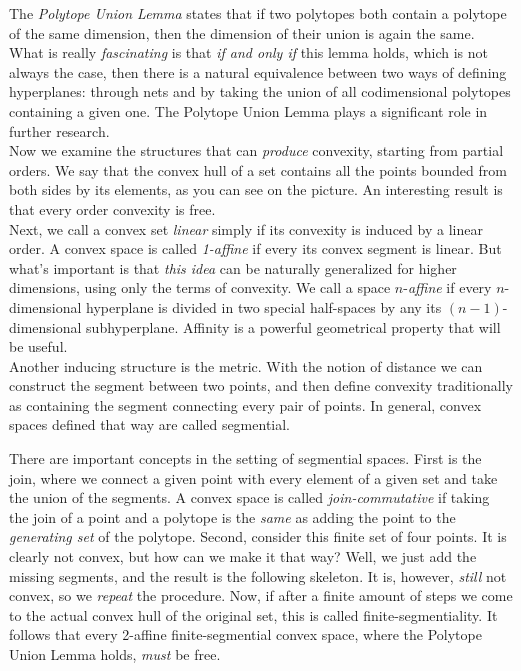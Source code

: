 \documentclass[12pt]{article}
\begin{document}
\newpage

The \textit{Polytope Union Lemma} states that if two polytopes both contain a polytope of the same dimension, then the dimension of their union is again the same. What is really \textit{fascinating} is that \textit{if and only if} this lemma holds, which is not always the case, then there is a natural equivalence between two ways of defining hyperplanes: through nets and by taking the union of all codimensional polytopes containing a given one. The Polytope Union Lemma plays a significant role in further research.\\



Now we examine the structures that can \textit{produce} convexity, starting from partial orders. We say that the convex hull of a set contains all the points bounded from both sides by its elements, as you can see on the picture. An interesting result is that every order convexity is free.\\

Next, we call a convex set \textit{linear} simply if its convexity is induced by a linear order. A convex space is called \textit{1-affine} if every its convex segment is linear. But what's important is that \textit{this idea} can be naturally generalized for higher dimensions, using only the terms of convexity. We call a space \(n\)-\textit{affine} if every \(n\)-dimensional hyperplane is divided in two special half-spaces by any its \((n-1)\)-dimensional subhyperplane. Affinity is a powerful geometrical property that will be useful.\\

Another inducing structure is the metric. With the notion of distance we can construct the segment between two points, and then define convexity traditionally as containing the segment connecting every pair of points. In general, convex spaces defined that way are called segmential.\\

\newpage

There are important concepts in the setting of segmential spaces. First is the join, where we connect a given point with every element of a given set and take the union of the segments. A convex space is called \textit{join-commutative} if taking the join of a point and a polytope is the \textit{same} as adding the point to the \textit{generating set} of the polytope. Second, consider this finite set of four points. It is clearly not convex, but how can we make it that way? Well, we just add the missing segments, and the result is the following skeleton. It is, however, \textit{still} not convex, so we \textit{repeat} the procedure. Now, if after a finite amount of steps we come to the actual convex hull of the original set, this is called finite-segmentiality. It follows that every 2-affine finite-segmential convex space, where the Polytope Union Lemma holds, \textit{must} be free.\\
\end{document}
